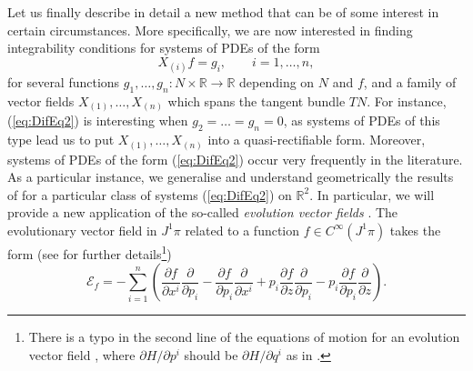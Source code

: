\documentclass[12pt]{article}
\theoremstyle{plain}
\theoremstyle{definition}
\numberwithin{equation}{section}
\begin{document}
Let us finally describe in detail a new method that can be of some interest in certain circumstances. More specifically, we are now interested in finding integrability conditions for systems of PDEs of the form
\begin{equation}\label{eq:DifEq2}
X_{(i)}f=g_i,\qquad i=1,\ldots,n,
\end{equation}
for several functions $g_1,\ldots,g_n:N\times \mathbb{R}\rightarrow\mathbb{R}$ depending on $N$ and $f$, and a family of vector fields $X_{(1)},\ldots,X_{(n)}$ which spans the tangent bundle $TN$. For instance, (\ref{eq:DifEq2}) is interesting when $g_2=\ldots=g_n=0$, as systems of PDEs of this type lead us to put $X_{(1)},\ldots,X_{(n)}$ into a quasi-rectifiable form. Moreover, systems of PDEs of the form (\ref{eq:DifEq2}) occur very frequently in the literature. As a particular instance, we  generalise and understand geometrically  the results of \cite[pg. 91]{Sn06} for a particular class of systems (\ref{eq:DifEq2}) on $\mathbb{R}^2$. In particular, we will provide a new application of the so-called {\it evolution vector fields} \cite{SLLM20}.
 The evolutionary vector field in $J^1
 \pi$ related to a function $f\in C^\infty(J^1\pi)$  takes the form (see \cite{LLM21,SLLM20} for further details\footnote{There is a typo in the second line of the equations of motion for an evolution vector field \cite[p.  6]{SLLM20}, where $\partial H/\partial p^i$ should be $\partial H/\partial q^i$ as in \cite[p. 2]{LLM21}.})
$$
\mathcal{E}_{f}=-\sum_{i=1}^n\left(\frac{\partial f }{\partial x^i}\frac{\partial}{\partial p_i}-\frac{\partial f }{\partial p_i}\frac{\partial}{\partial x^i}+p_i\frac{\partial f }{\partial z}\frac{\partial}{\partial p_i}-p_i\frac{\partial f }{\partial p_i}\frac{\partial}{\partial z}\right).
$$
\end{document}

